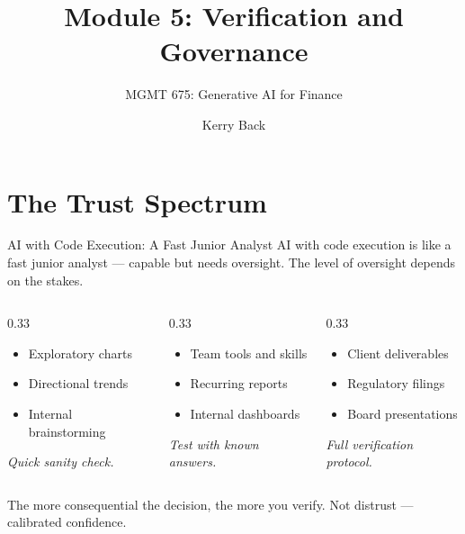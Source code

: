 \documentclass[aspectratio=169]{beamer}
\subtitle{MGMT 675: Generative AI for Finance}
\title{Module 5: Verification and Governance}
\author{Kerry Back}
\date{}
\begin{document}
\maketitle

\section{The Trust Spectrum}

\begin{frame}[shrink=5]{AI with Code Execution: A Fast Junior Analyst}
AI with code execution is like a \alert{fast junior analyst} --- capable but needs oversight. The level of oversight depends on the stakes.
\vspace{0.3cm}
\begin{columns}[T]
\begin{column}{0.33\textwidth}
\begin{shadedbox}[title=\textbf{Low-Stakes}]
\begin{itemize}\small
  \item Exploratory charts
  \item Directional trends
  \item Internal brainstorming
\end{itemize}
\vspace{0.2cm}
\centering\small\textit{Quick sanity check.}
\end{shadedbox}
\end{column}
\begin{column}{0.33\textwidth}
\begin{shadedbox}[title=\textbf{Medium-Stakes}]
\begin{itemize}\small
  \item Team tools and skills
  \item Recurring reports
  \item Internal dashboards
\end{itemize}
\vspace{0.2cm}
\centering\small\textit{Test with known answers.}
\end{shadedbox}
\end{column}
\begin{column}{0.33\textwidth}
\begin{shadedbox}[title=\textbf{High-Stakes}]
\begin{itemize}\small
  \item Client deliverables
  \item Regulatory filings
  \item Board presentations
\end{itemize}
\vspace{0.2cm}
\centering\small\textit{Full verification protocol.}
\end{shadedbox}
\end{column}
\end{columns}
\vspace{0.3cm}
The more consequential the decision, the more you verify. \alert{Not distrust --- calibrated confidence.}
\end{frame}
\end{document}
